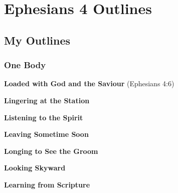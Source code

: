 \section{Ephesians 4 Outlines}

\subsection{My Outlines}

\subsubsection{One Body}
\begin{compactenum}[I.][8]
    \item \textbf{Loaded with God and the Saviour}  (Ephesians 4:6)
    \item \textbf{Lingering at the Station} %
    \item \textbf{Listening to the Spirit} %
    \item \textbf{Leaving Sometime Soon} %
    \item \textbf{Longing to See the Groom} %
    \item \textbf{Looking Skyward} %
    \item \textbf{Learning from Scripture} %
\end{compactenum}


